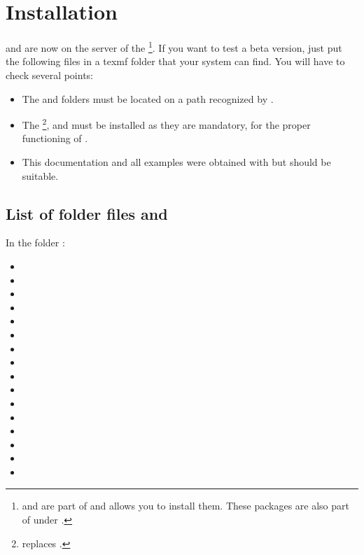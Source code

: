 \section{Installation}

 and  are now on the server of
the \footnote{ and 
are part of  and  allows you to install them.
These packages are also part of  under .}. If
you want to test a beta version, just put the following files in a texmf folder
that your system can find.
You will have to check several points:

\begin{itemize}\setlength{\itemsep}{5pt}
\item The  and  folders must be
located on a path recognized by .
\item The \footnote{ replaces
.},  and  must be
installed as they are mandatory, for the proper functioning of
.
\item This documentation and all examples were obtained with
 but  should be suitable.
\end{itemize}

\subsection{List of folder files   and }

In the folder :

\begin{itemize}
\item {}
\item {}
\item {}
\item {}
\item {}
\item {}
\item {}
\item {}
\item {}
\item {}
\item {}
\item {}
\item {}
\item {}
\item {}
\item {}
\end{itemize}

